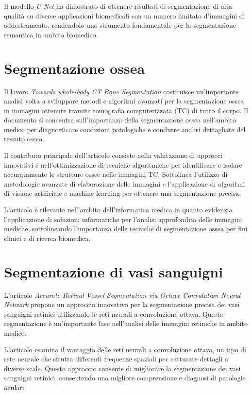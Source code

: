 Il modello \textit{U-Net} ha dimostrato di ottenere risultati di segmentazione
di alta qualità su diverse applicazioni biomedicali con un numero limitato d'immagini di addestramento, rendendolo uno strumento fondamentale per la
segmentazione semantica in ambito biomedico.




\section{Segmentazione ossea} \label{sec:segmentazione_ossea}

Il lavoro \textit{Towards whole-body CT Bone Segmentation}
\cite{10.1007/978-3-662-56537-7_59} costituisce un'importante analisi volta a
sviluppare metodi e algoritmi avanzati per la segmentazione ossea in immagini
ottenute tramite tomografia computerizzata (TC) di tutto il corpo. Il documento
si concentra sull'importanza della segmentazione ossea nell'ambito medico per
diagnosticare condizioni patologiche e condurre analisi dettagliate del tessuto
osseo.

Il contributo principale dell'articolo consiste nella valutazione di approcci
innovativi e nell'ottimizzazione di tecniche algoritmiche per identificare e
isolare accuratamente le strutture ossee nelle immagini TC. Sottolinea
l'utilizzo di metodologie avanzate di elaborazione delle immagini e
l'applicazione di algoritmi di visione artificiale e machine learning per
ottenere una segmentazione precisa.

L'articolo è rilevante nell'ambito dell'informatica medica in quanto evidenzia
l'applicazione di soluzioni informatiche per l'analisi approfondita delle
immagini mediche, sottolineando l'importanza delle tecniche di segmentazione
ossea per fini clinici e di ricerca biomedica.


\section{Segmentazione di vasi sanguigni}
\label{sec:segmentazione_vasi_sanguigni}

L'articolo \textit{Accurate Retinal Vessel Segmentation via Octave Convolution
Neural Network} \cite{fan2020accurate} propone un approccio innovativo per la
segmentazione precisa dei vasi sanguigni retinici utilizzando le reti neurali a
convoluzione ottava. Questa segmentazione è un'importante fase nell'analisi
delle immagini retiniche in ambito medico.

L'articolo esamina il vantaggio delle reti neurali a convoluzione ottava, un
tipo di rete neurale che sfrutta differenti frequenze spaziali per catturare
dettagli a diverse scale. Questo approccio consente di migliorare la
segmentazione dei vasi sanguigni retinici, consentendo una migliore
comprensione e diagnosi di patologie oculari.

